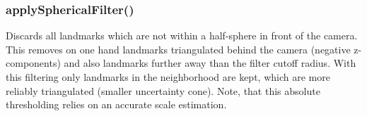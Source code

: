 \subsubsection{applySphericalFilter()}
\label{sub_sec_sphFilter}
Discards all landmarks which are not within a half-sphere in front of the camera. This removes on one hand landmarks triangulated behind the camera (negative z-components) and also landmarks further away than the filter cutoff radius. With this filtering only landmarks in the neighborhood are kept, which are more reliably triangulated (smaller uncertainty cone). Note, that this absolute thresholding relies on an accurate scale estimation.